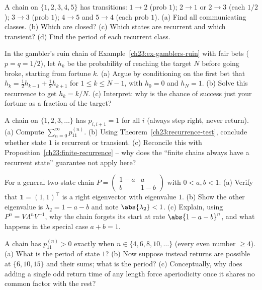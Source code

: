 \begin{exercise}
\label{ch23:ex-classify}
A chain on $\{1,2,3,4,5\}$ has transitions: $1 \to 2$ (prob $1$); $2 \to 1$ or $2 \to 3$
(each $1/2$); $3 \to 3$ (prob $1$); $4 \to 5$ and $5 \to 4$ (each prob $1$). (a) Find all
communicating classes. (b) Which are closed? (c) Which states are recurrent and which
transient? (d) Find the period of each recurrent class.
\end{exercise}

\begin{exercise}
\label{ch23:ex-ruin}
In the gambler's ruin chain of Example~\ref{ch23:ex-gamblers-ruin} with fair bets
($p = q = 1/2$), let $h_k$ be the probability of reaching the target $N$ before going broke,
starting from fortune $k$. (a) Argue by conditioning on the first bet that
$h_k = \tfrac12 h_{k-1} + \tfrac12 h_{k+1}$ for $1 \le k \le N-1$, with $h_0 = 0$ and
$h_N = 1$. (b) Solve this recurrence to get $h_k = k/N$. (c) Interpret: why is the chance of
success just your fortune as a fraction of the target?
\end{exercise}

\begin{exercise}
\label{ch23:ex-recurrence-sum}
A chain on $\{1, 2, 3, \dots\}$ has $p_{i,i+1} = 1$ for all $i$ (always step right, never
return). (a) Compute $\sum_{n=0}^\infty p_{11}^{(n)}$. (b) Using
Theorem~\ref{ch23:recurrence-test}, conclude whether state $1$ is recurrent or transient.
(c) Reconcile this with Proposition~\ref{ch23:finite-recurrence} -- why does the ``finite
chains always have a recurrent state'' guarantee not apply here?
\end{exercise}

\begin{exercise}
\label{ch23:ex-eigen}
For a general two-state chain $P = \left(\begin{smallmatrix} 1-a & a \\ b & 1-b
\end{smallmatrix}\right)$ with $0 < a, b < 1$: (a) Verify that $\mathbf{1} = (1,1)^\top$ is a
right eigenvector with eigenvalue $1$. (b) Show the other eigenvalue is $\lambda_2 = 1 - a -
b$ and note $\abs{\lambda_2} < 1$. (c) Explain, using
$P^n = V \Lambda^n V^{-1}$, why the chain forgets its start at rate $\abs{1-a-b}^n$, and what
happens in the special case $a + b = 1$.
\end{exercise}

\begin{exercise}
\label{ch23:ex-period-gcd}
A chain has $p_{11}^{(n)} > 0$ exactly when $n \in \{4, 6, 8, 10, \dots\}$ (every even number
$\ge 4$). (a) What is the period of state $1$? (b) Now suppose instead returns are possible at
$\{6, 10, 15\}$ and their sums; what is the period? (c) Conceptually, why does adding a single
odd return time of any length force aperiodicity once it shares no common factor with the
rest?
\end{exercise}

